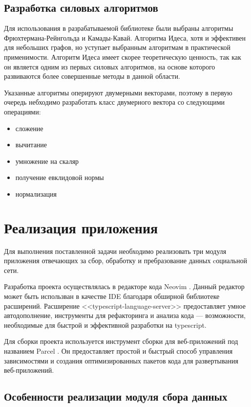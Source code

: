 \documentclass[14pt, russian]{scrartcl}
\begin{document}
\subsection{Разработка силовых алгоритмов}

Для использования в разрабатываемой библиотеке были выбраны алгоритмы Фрюхтермана-Рейнгольда и Камады-Кавай. Алгоритма Идеса, хотя и эффективен для небольших графов, но уступает выбранным алгоритмам в практической применимости. Алгоритм Идеса имеет скорее теоретическую ценность, так как он является одним из первых силовых алгоритмов, на основе которого развиваются более совершенные методы в данной области.

Указанные алгоритмы оперируют двумерными векторами, поэтому в первую очередь небходимо разработать класс двумерного вектора со следующими операциями: 

\begin{itemize}
  \item сложение 
  \item вычитание
  \item умножение на скаляр
  \item получение евклидовой нормы
  \item нормализация 
\end{itemize}




\section{Реализация приложения}

Для выполнения поставленной задачи необходимо реализовать три
модуля приложения отвечающих за сбор, обработку и пребразование данных cоциальной сети.

Разработка проекта осуществлялась в редакторе кода Neovim \cite{NVIM}. Данный редактор может быть использван в качестве IDE благодаря обширной библиотеке расширений. 
Расширение <<typescript-language-server>> \cite{TSLSP} предоставляет умное автодополнение, инструменты для рефакторинга и анализа кода --- возможности, необходимые для быстрой и
эффективной разработки на typescript.

Для сборки проекта используется  инструмент сборки для веб-приложений под названием Parcel \cite{PARCEL}.
Он предоставляет простой и быстрый способ управления зависимостями и создания оптимизированных пакетов кода для развертывания веб-приложений.

\subsection{Особенности реализации модуля сбора данных}
\end{document}
